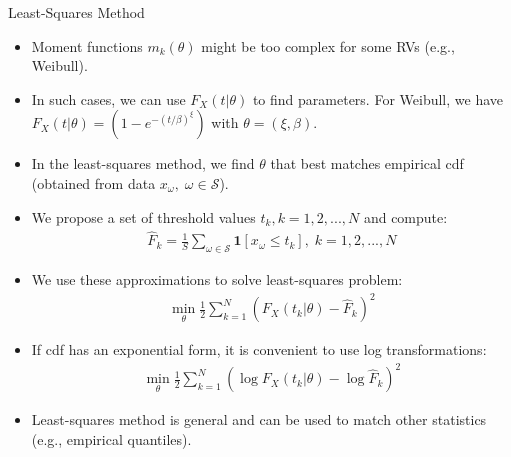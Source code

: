 \documentclass[handout,9pt]{beamer}
\begin{document}
%
\begin{frame}{Least-Squares Method}

\begin{itemize}

\item Moment functions $m_k(\theta)$ might be too complex for some RVs (e.g., Weibull).

\item In such cases, we can use $F_X(t|\theta)$ to find parameters. For Weibull, we have $F_X(t|\theta)=(1-e^{-(t/\beta)^\xi})$ with $\theta=(\xi,\beta)$. 

\item In the least-squares method, we find $\theta$ that best matches empirical cdf (obtained from data $x_\omega,\; \omega \in \mathcal{S}$). 

\item We propose a set of threshold values $t_k, k=1,2,...,N$ and compute:
\begin{align*}
\hat{F}_k=\frac{1}{S}\sum_{\omega \in \mathcal{S}}\mathbf{1}[x_\omega\leq t_k],\; k=1,2,...,N
\end{align*}

\item  We use these approximations to solve least-squares problem:
\begin{align*}
\min_\theta \frac{1}{2}\sum_{k=1}^N(F_X(t_k|\theta)-\hat{F}_k)^2
\end{align*}
\item If cdf has an exponential form, it is convenient to use log transformations:
 \begin{align*}
\min_\theta \frac{1}{2}\sum_{k=1}^N(\log F_X(t_k|\theta)-\log \hat{F}_k)^2
\end{align*}
\item Least-squares method is general and can be used to match other statistics (e.g., empirical quantiles).

\end{itemize}

\end{frame}
\end{document}
